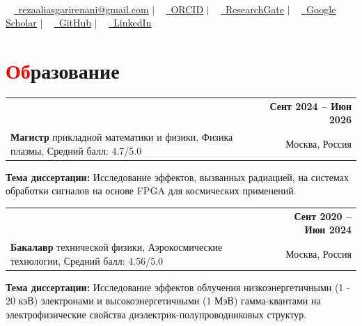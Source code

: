 \documentclass[a4paper, 10pt]{article}
\makeatletter
\newcommand{\resumeItem}[1]{
    \item\small{
        {#1 \vspace{-2pt}}
    }
}
\newcommand{\resumeSubheading}[4]{
    \vspace{-2pt}\item
    \begin{tabular*}{1.0\textwidth}[t]{l@{\extracolsep{\fill}}r}
        \textbf{#1} & \textbf{\small #2} \\
        \small#3 & \small #4
    \end{tabular*}\vspace{-5pt}
}
\newcommand{\resumeSubHeadingListStart}{\begin{itemize}[leftmargin=0.0in, label={}]}
\newcommand{\resumeSubHeadingListEnd}{\end{itemize}}
\makeatother
\begin{document}
\begin{center}
    {\Huge {\fontsize{25}{30}\selectfont{Реза}} {\fontsize{25}{30}}} \\ \vspace{3pt}
    \small ~ 
    \href{mailto:rezaaliasgarirenani@gmail.com}{\raisebox{-0.2\height}\faEnvelope\ \underline{rezaaliasgarirenani@gmail.com}} $|$ ~
    \href{https://orcid.org/0009-0000-8983-755X}{\raisebox{-0.2\height}\faOrcid\ \underline{ORCID}} $|$ ~
    \href{https://www.researchgate.net/profile/Reza-Aliasgari-Renani}{\raisebox{-0.2\height}\faResearchgate\
    \underline{ResearchGate}} $|$ ~
    \href{https://scholar.google.com/citations?user=L9Vv3C8AAAAJ&hl=en}{\raisebox{-0.2\height}\faGraduationCap\ \underline{Google Scholar}} $|$ ~
    \href{https://github.com/rezaaliasgarirenani}{\raisebox{-0.2\height}\faGithub\ \underline{GitHub}} $|$ ~
    \href{https://linkedin.com/in/reza-aliasgari-renani}{\raisebox{-0.2\height}\faLinkedin\ \underline{LinkedIn}}
    \vspace{-10pt}
\end{center}

\section{\textcolor{red}{Об}разование}
\resumeSubHeadingListStart
    \resumeSubheading
        {\href{https://mipt.ru/}{\parbox[t]{\dimexpr\linewidth-6cm}{Московский физико-технический институт (МФТИ, Физтех)}}}{Сент 2024 -- Июн 2026}
        {\textbf{Магистр} прикладной математики и физики, Физика плазмы, Средний балл: 4.7/5.0}{Москва, Россия}
        {\resumeItem{\textbf{Тема диссертации:} Исследование эффектов, вызванных радиацией, на системах обработки сигналов на основе FPGA для космических применений.}}
    \resumeSubheading
        {\href{https://mipt.ru/}{\parbox[t]{\dimexpr\linewidth-6cm}{Московский физико-технический институт (МФТИ, Физтех)}}}{Сент 2020 -- Июн 2024}
        {\textbf{Бакалавр} технической физики, Аэрокосмические технологии, Средний балл: 4.56/5.0}{Москва, Россия}
        {\resumeItem{\textbf{Тема диссертации:} Исследование эффектов облучения низкоэнергетичными (1 - 20 кэВ) электронами и высокоэнергетичными (1 МэВ) гамма-квантами на электрофизические свойства диэлектрик-полупроводниковых структур.}}
\resumeSubHeadingListEnd
\vspace{-25pt}

\end{document}

